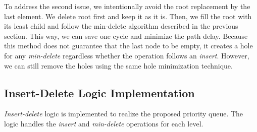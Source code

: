 To address the second issue, we intentionally avoid the root replacement by the last element.
We delete root first and keep it as it is.
Then, we fill the root with its least child and follow the min-delete algorithm described in the previous section.
This way, we can save one cycle and minimize the path delay.
Because this method does not guarantee that the last node to be empty, it creates a hole for any {\it min-delete} regardless whether the operation follows an {\it insert}. 
However, we can still remove the holes using the same hole minimization technique.

\subsection{Insert-Delete Logic Implementation}

{\it Insert-delete} logic is implemented to realize the proposed priority queue.
The logic handles the {\it insert} and {\it min-delete} operations for each level.

\begin{algorithm}
\label{algo1}
        \caption{$Insert-Delete (data, opcode)$}
\label{algo1}
        \begin{algorithmic}[1]
                \ENDIF
            \ENDFOR
          \ELSE
            \ELSE

            \ENDIF

          \ENDWHILE
        \ENDIF

        \end{algorithmic}
\end{algorithm}

